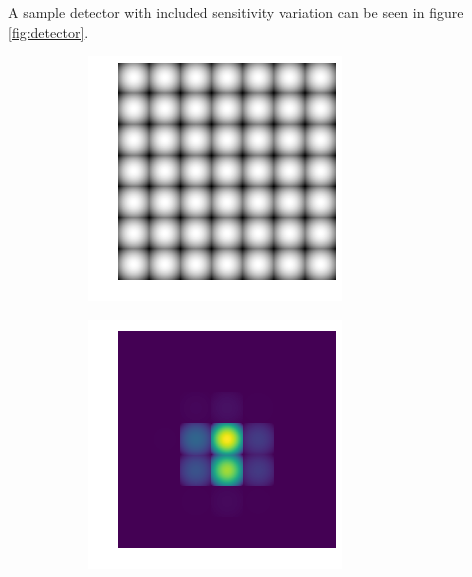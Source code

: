 \documentclass[12pt,preprint]{aastex}
\begin{document}
A sample detector with included sensitivity variation can be seen in figure \ref{fig:detector}.

\begin{figure}[h!]
  \centering
  \begin{subfigure}[b]{0.25\textwidth}
    \centering
    \includegraphics[width=.9\linewidth]{detector.png}
		\caption{}
  \end{subfigure}%
  \quad
  \begin{subfigure}[b]{0.25\textwidth}
    \centering
    \includegraphics[width=.9\linewidth]{uninterpolated.png}

\end{subfigure}
\end{figure}
\end{document}
